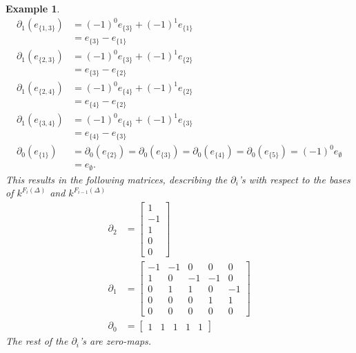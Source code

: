 \documentclass[11pt,a4paper,twoside]{report}
\newtheorem{myex}[mythm]{Example}
\begin{document}
\begin{myex}
\begin{align*}
\partial_1(e_{\{1,3\}})&=(-1)^0e_{\{3\}}+(-1)^1e_{\{1\}}\\
&=e_{\{3\}}-e_{\{1\}}\\
\partial_1(e_{\{2,3\}})&=(-1)^0e_{\{3\}}+(-1)^1e_{\{2\}}\\
&=e_{\{3\}}-e_{\{2\}}\\
\partial_1(e_{\{2,4\}})&=(-1)^0e_{\{4\}}+(-1)^1e_{\{2\}}\\
&=e_{\{4\}}-e_{\{2\}}\\
\partial_1(e_{\{3,4\}})&=(-1)^0e_{\{4\}}+(-1)^1e_{\{3\}}\\
&=e_{\{4\}}-e_{\{3\}}\\
\partial_0(e_{\{1\}})&=\partial_0(e_{\{2\}})=\partial_0(e_{\{3\}})=\partial_0(e_{\{4\}})=\partial_0(e_{\{5\}})=(-1)^0e_{\emptyset}\\
&=e_{\emptyset}.
\end{align*}
This results in the following matrices, describing the $\partial_i$'s with respect to the bases of $k^{F_i(\Delta)}$ and $k^{F_{i-1}(\Delta)}$
\begin{align*}
\partial_2&=
\begin{bmatrix}
1\\
-1\\
1\\
0\\
0
\end{bmatrix}\\
\partial_1&=
\begin{bmatrix}
-1 & -1 & 0 & 0 & 0\\
1 & 0 & -1 & -1 & 0\\
0 & 1 & 1 & 0 & -1\\
0 & 0 & 0 & 1 & 1\\
0 & 0 & 0 & 0 & 0
\end{bmatrix}\\
\partial_0&=
\begin{bmatrix}
1 & 1 & 1 & 1 & 1 
\end{bmatrix}
\end{align*}
The rest of the $\partial_i$'s are zero-maps.


\end{myex}
\end{document}
